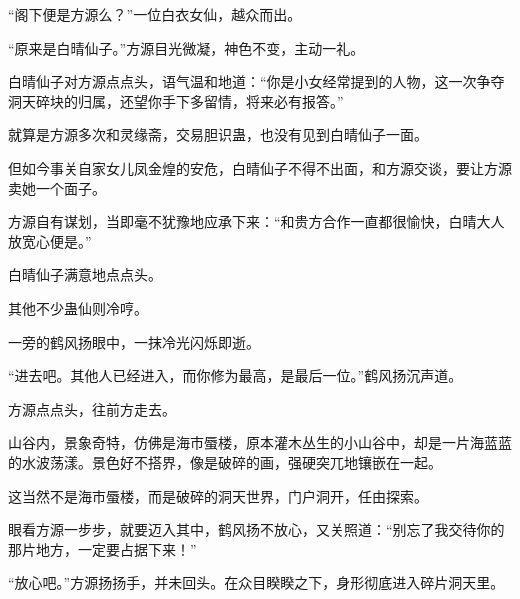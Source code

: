\begin{this_body}
“阁下便是方源么？”一位白衣女仙，越众而出。

“原来是白晴仙子。”方源目光微凝，神色不变，主动一礼。

白晴仙子对方源点点头，语气温和地道：“你是小女经常提到的人物，这一次争夺洞天碎块的归属，还望你手下多留情，将来必有报答。”

就算是方源多次和灵缘斋，交易胆识蛊，也没有见到白晴仙子一面。

但如今事关自家女儿凤金煌的安危，白晴仙子不得不出面，和方源交谈，要让方源卖她一个面子。

方源自有谋划，当即毫不犹豫地应承下来：“和贵方合作一直都很愉快，白晴大人放宽心便是。”

白晴仙子满意地点点头。

其他不少蛊仙则冷哼。

一旁的鹤风扬眼中，一抹冷光闪烁即逝。

“进去吧。其他人已经进入，而你修为最高，是最后一位。”鹤风扬沉声道。

方源点点头，往前方走去。

山谷内，景象奇特，仿佛是海市蜃楼，原本灌木丛生的小山谷中，却是一片海蓝蓝的水波荡漾。景色好不搭界，像是破碎的画，强硬突兀地镶嵌在一起。

这当然不是海市蜃楼，而是破碎的洞天世界，门户洞开，任由探索。

眼看方源一步步，就要迈入其中，鹤风扬不放心，又关照道：“别忘了我交待你的那片地方，一定要占据下来！”

“放心吧。”方源扬扬手，并未回头。在众目睽睽之下，身形彻底进入碎片洞天里。

\end{this_body}


